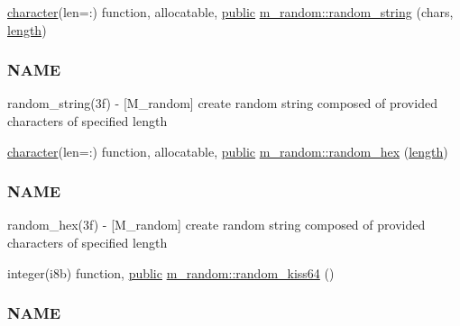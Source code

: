 \begin{DoxyCompactItemize}
\item 
\hyperlink{option__stopwatch_83_8txt_abd4b21fbbd175834027b5224bfe97e66}{character}(len=\+:) function, allocatable, \hyperlink{M__stopwatch_83_8txt_a2f74811300c361e53b430611a7d1769f}{public} \hyperlink{namespacem__random_aec553bcbd72af521bc24d9f81aea5652}{m\+\_\+random\+::random\+\_\+string} (chars, \hyperlink{M__stopwatch_83_8txt_a04ed5ef37abacfa36a856b5f30376485}{length})
\begin{DoxyCompactList}\small\item\em \subsubsection*{N\+A\+ME}

random\+\_\+string(3f) -\/ \mbox{[}M\+\_\+random\mbox{]} create random string composed of provided characters of specified length \end{DoxyCompactList}\item 
\hyperlink{option__stopwatch_83_8txt_abd4b21fbbd175834027b5224bfe97e66}{character}(len=\+:) function, allocatable, \hyperlink{M__stopwatch_83_8txt_a2f74811300c361e53b430611a7d1769f}{public} \hyperlink{namespacem__random_a2fa2c1b1bcef16ff3be995981738cec0}{m\+\_\+random\+::random\+\_\+hex} (\hyperlink{M__stopwatch_83_8txt_a04ed5ef37abacfa36a856b5f30376485}{length})
\begin{DoxyCompactList}\small\item\em \subsubsection*{N\+A\+ME}

random\+\_\+hex(3f) -\/ \mbox{[}M\+\_\+random\mbox{]} create random string composed of provided characters of specified length \end{DoxyCompactList}\item 
integer(i8b) function, \hyperlink{M__stopwatch_83_8txt_a2f74811300c361e53b430611a7d1769f}{public} \hyperlink{namespacem__random_a02085190ba5e6a34a61d89800f01a34b}{m\+\_\+random\+::random\+\_\+kiss64} ()
\begin{DoxyCompactList}\small\item\em \subsubsection*{N\+A\+ME}


\end{DoxyCompactList}
\end{DoxyCompactItemize}
